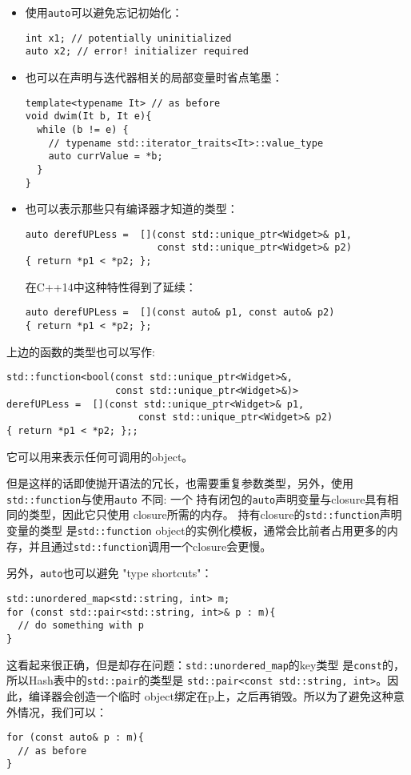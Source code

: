 \begin{itemize}
\item 使用\texttt{auto}可以避免忘记初始化：
\begin{verbatim}
int x1; // potentially uninitialized
auto x2; // error! initializer required
\end{verbatim}
\item 也可以在声明与迭代器相关的局部变量时省点笔墨：
\begin{verbatim}
template<typename It> // as before
void dwim(It b, It e){
  while (b != e) {
    // typename std::iterator_traits<It>::value_type
    auto currValue = *b; 
  }
}
\end{verbatim}
\item 也可以表示那些只有编译器才知道的类型：
\begin{verbatim}
auto derefUPLess =  [](const std::unique_ptr<Widget>& p1,
                       const std::unique_ptr<Widget>& p2)
{ return *p1 < *p2; };
\end{verbatim}
  在C++14中这种特性得到了延续：
\begin{verbatim}
auto derefUPLess =  [](const auto& p1, const auto& p2)
{ return *p1 < *p2; };
\end{verbatim}
\end{itemize}

上边的函数的类型也可以写作:
\begin{verbatim}
std::function<bool(const std::unique_ptr<Widget>&,
                   const std::unique_ptr<Widget>&)>
derefUPLess =  [](const std::unique_ptr<Widget>& p1,
                       const std::unique_ptr<Widget>& p2)
{ return *p1 < *p2; };;
\end{verbatim}
它可以用来表示任何可调用的object。

但是这样的话即使抛开语法的冗长，也需要重复参数类型，另外，使用
\texttt{std::function}与使用\texttt{auto} 不同: 一个
持有闭包的\texttt{auto}声明变量与closure具有相同的类型，因此它只使用
closure所需的内存。 持有closure的\texttt{std::function}声明变量的类型
是\texttt{std::function}  object的实例化模板，通常会比前者占用更多的内
存，并且通过\texttt{std::function}调用一个closure会更慢。

另外，\texttt{auto}也可以避免 "type shortcuts"：
\begin{verbatim}
std::unordered_map<std::string, int> m;
for (const std::pair<std::string, int>& p : m){
  // do something with p
}
\end{verbatim}
这看起来很正确，但是却存在问题：\texttt{std::unordered\_map}的key类型
是\texttt{const}的，所以Hash表中的\texttt{std::pair}的类型是
\texttt{std::pair<const std::string, int>}。因此，编译器会创造一个临时
object绑定在p上，之后再销毁。所以为了避免这种意外情况，我们可以：
\begin{verbatim}
for (const auto& p : m){
  // as before
}
\end{verbatim}

